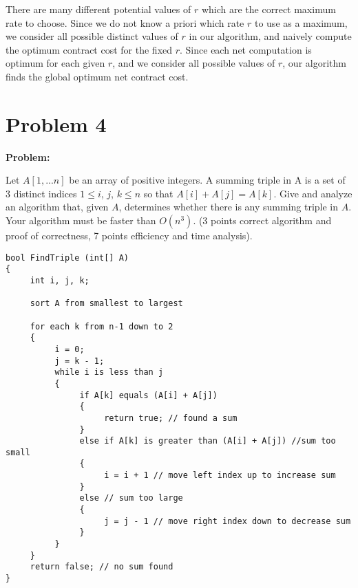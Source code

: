\documentclass[11pt]{article}
\begin{document}
There are many different potential values of $r$ which are the correct maximum
rate to choose. Since we do not know a priori which rate $r$ to use as a 
maximum, we consider all possible distinct values of $r$ in our algorithm, 
and naively compute the optimum contract cost for the fixed $r$. Since each
net computation is optimum for each given $r$, and we consider all possible
values of $r$, our algorithm finds the global optimum net contract cost. 




\section*{Problem 4} 
{\bf Problem:}

Let $A[1, ...n]$ be an array of positive integers. A summing triple in A is a
set of 3 distinct indices $1 \leq i$, $j$,
$k \leq n$ so that $A[i] + A[j] = A[k]$.  Give and analyze an algorithm that,
given $A$, determines whether there is any summing triple in $A$. Your
algorithm must be faster than $O(n^{3})$.  (3 points correct algorithm and
proof of correctness, 7 points efficiency and time analysis).

\begin{verbatim}
bool FindTriple (int[] A)
{
     int i, j, k;

     sort A from smallest to largest

     for each k from n-1 down to 2
     {
          i = 0;
          j = k - 1;
          while i is less than j
          {
               if A[k] equals (A[i] + A[j])
               {
                    return true; // found a sum
               }
               else if A[k] is greater than (A[i] + A[j]) //sum too small
               {
                    i = i + 1 // move left index up to increase sum 
               }
               else // sum too large
               {
                    j = j - 1 // move right index down to decrease sum
               }
          }
     }
     return false; // no sum found
}

\end{verbatim}
\end{document}
